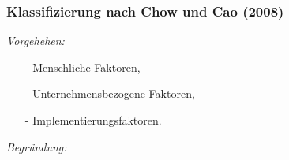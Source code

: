 \noindent
\subsubsection{Klassifizierung nach Chow und Cao (2008)}
\textit{Vorgehehen:}\\\noindent

\begin{itemize}\itemsep0pt
\item[-]Menschliche Faktoren,
\item[-]Unternehmensbezogene Faktoren,
\item[-]Implementierungsfaktoren.
\end{itemize}

\textit{Begründung:}\\\noindent